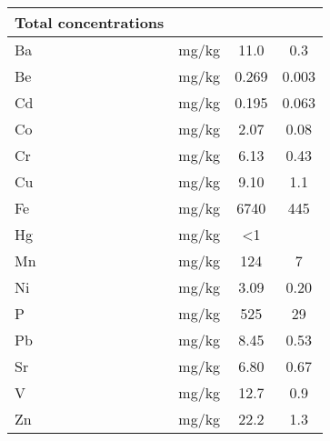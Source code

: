 \begin{table}
\begin{tabular}{lccc}
\textbf{Total concentrations} & \multicolumn{1}{l}{\textbf{}} & \multicolumn{1}{l}{\textbf{}} & \multicolumn{1}{l}{\textbf{}} \\ \hline \addlinespace
Ba                            & mg/kg                         & 11.0                         & 0.3                           \\
Be                            & mg/kg                         & 0.269                         & 0.003                         \\
Cd                            & mg/kg                         & 0.195                          & 0.063                          \\
Co                            & mg/kg                         & 2.07                         & 0.08                          \\
Cr                            & mg/kg                         & 6.13                          & 0.43                           \\
Cu                            & mg/kg                         & 9.10                          & 1.1                          \\
Fe                            & mg/kg                         & 6740                       & 445                         \\
Hg                            & mg/kg                      & \textless{}1                  &                               \\
Mn                            & mg/kg                      & 124                        & 7                          \\
Ni                            & mg/kg                      & 3.09                          & 0.20                           \\
P                             & mg/kg                      & 525                       & 29                          \\
Pb                            & mg/kg                      & 8.45                          & 0.53       \\ 
Sr & mg/kg & 6.80 & 0.67 \\
V & mg/kg & 12.7 & 0.9 \\
Zn & mg/kg & 22.2 & 1.3 \\ \bottomrule          
\end{tabular}
\end{table}